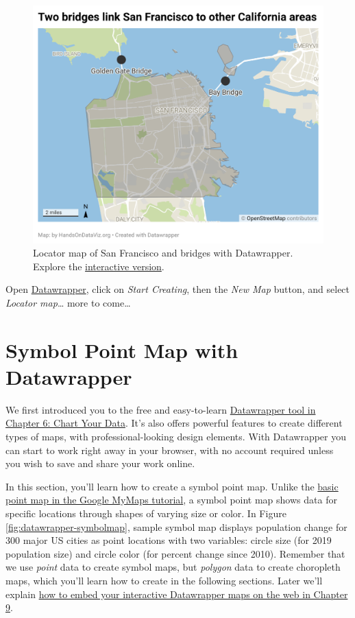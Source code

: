 \documentclass[
  english,
]{book}
\begin{document}
\begin{figure}
\centering
\includegraphics{images/07-map/datawrapper-locatormap.png}
\caption{\label{fig:datawrapper-locatormap}Locator map of San Francisco and bridges with Datawrapper. Explore the \href{https://datawrapper.dwcdn.net/KwU8I}{interactive version}.}
\end{figure}

Open \href{https://www.datawrapper.de}{Datawrapper}, click on \emph{Start Creating}, then the \emph{New Map} button, and select \emph{Locator map}\ldots{} more to come\ldots{}

\hypertarget{symbolmap-datawrapper}{%
\section*{Symbol Point Map with Datawrapper}\label{symbolmap-datawrapper}}

We first introduced you to the free and easy-to-learn \href{chart-datawrapper.html}{Datawrapper tool in Chapter 6: Chart Your Data}. It's also offers powerful features to create different types of maps, with professional-looking design elements. With Datawrapper you can start to work right away in your browser, with no account required unless you wish to save and share your work online.

In this section, you'll learn how to create a symbol point map. Unlike the \href{mymaps.html}{basic point map in the Google MyMaps tutorial}, a symbol point map shows data for specific locations through shapes of varying size or color. In Figure \ref{fig:datawrapper-symbolmap}, sample symbol map displays population change for 300 major US cities as point locations with two variables: circle size (for 2019 population size) and circle color (for percent change since 2010). Remember that we use \emph{point} data to create symbol maps, but \emph{polygon} data to create choropleth maps, which you'll learn how to create in the following sections. Later we'll explain \href{embed.html}{how to embed your interactive Datawrapper maps on the web in Chapter 9}.
\end{document}
